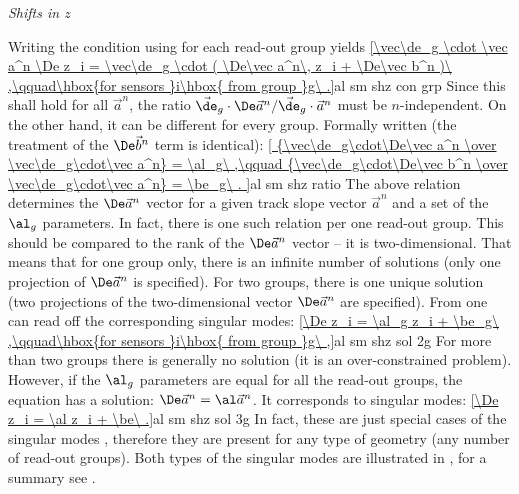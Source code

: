 
\baselineskip
\indent\em{Shifts in $z$}

Writing the condition  using  for each read-out group yields
\eqref{\vec\de_g \cdot \vec a^n \De z_i = \vec\de_g \cdot (
	\De\vec a^n\, z_i + \De\vec b^n
)\ ,\qquad\hbox{for sensors }i\hbox{ from group }g\ .}{al sm shz con grp}
Since this shall hold for all $\vec a^n$, the ratio $\vec\de_g\cdot\De\vec a^n / \vec\de_g\cdot\vec a^n$ must be $n$-independent. On the other hand, it can be different for every group. Formally written (the treatment of the $\De\vec b^n$ term is identical):
\eqref{
{\vec\de_g\cdot\De\vec a^n \over \vec\de_g\cdot\vec a^n} = \al_g\ ,\qquad
{\vec\de_g\cdot\De\vec b^n \over \vec\de_g\cdot\vec a^n} = \be_g\ .
}{al sm shz ratio}
The above relation determines the $\De\vec a^n$ vector for a given track slope vector $\vec a^n$ and a set of the $\al_g$ parameters. In fact, there is one such relation per one read-out group. This should be compared to the rank of the $\De\vec a^n$ vector -- it is two-dimensional. That means that for one group only, there is an infinite number of solutions (only one projection of $\De\vec a^n$ is specified). For two groups, there is one unique solution (two projections of the two-dimensional vector $\De\vec a^n$ are specified). From  one can read off the corresponding singular modes:
\eqref{\De z_i = \al_g z_i + \be_g\ ,\qquad\hbox{for sensors }i\hbox{ from group }g\ ,}{al sm shz sol 2g}
For more than two groups there is generally no solution (it is an over-constrained problem). However, if the $\al_g$ parameters are equal for all the read-out groups, the equation has a solution: $\De\vec a^n = \al \vec a^n$. It corresponds to singular modes:
\eqref{\De z_i = \al z_i + \be\ .}{al sm shz sol 3g}
In fact, these are just special cases of the singular modes , therefore they are present for any type of geometry (any number of read-out groups). Both types of the singular modes are illustrated in , for a summary see .


